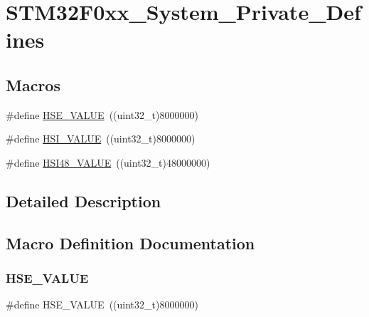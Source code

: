 \hypertarget{group___s_t_m32_f0xx___system___private___defines}{}\section{S\+T\+M32\+F0xx\+\_\+\+System\+\_\+\+Private\+\_\+\+Defines}
\label{group___s_t_m32_f0xx___system___private___defines}
\subsection*{Macros}
\begin{DoxyCompactItemize}
\item 
\#define \hyperlink{group___s_t_m32_f0xx___system___private___defines_gaeafcff4f57440c60e64812dddd13e7cb}{H\+S\+E\+\_\+\+V\+A\+L\+UE}~((uint32\+\_\+t)8000000)
\item 
\#define \hyperlink{group___s_t_m32_f0xx___system___private___defines_gaaa8c76e274d0f6dd2cefb5d0b17fbc37}{H\+S\+I\+\_\+\+V\+A\+L\+UE}~((uint32\+\_\+t)8000000)
\item 
\#define \hyperlink{group___s_t_m32_f0xx___system___private___defines_ga47f01e5e3f2edfa94bf74c08835f3875}{H\+S\+I48\+\_\+\+V\+A\+L\+UE}~((uint32\+\_\+t)48000000)
\end{DoxyCompactItemize}


\subsection{Detailed Description}


\subsection{Macro Definition Documentation}
\hypertarget{group___s_t_m32_f0xx___system___private___defines_gaeafcff4f57440c60e64812dddd13e7cb}{}\label{group___s_t_m32_f0xx___system___private___defines_gaeafcff4f57440c60e64812dddd13e7cb} 
\subsubsection{\texorpdfstring{H\+S\+E\+\_\+\+V\+A\+L\+UE}{HSE\_VALUE}}
{\footnotesize\ttfamily \#define H\+S\+E\+\_\+\+V\+A\+L\+UE~((uint32\+\_\+t)8000000)}

